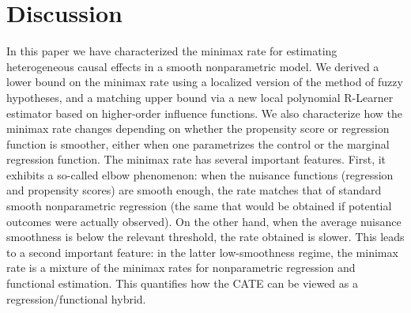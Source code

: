 \documentclass[11pt,twoside]{article}
\theoremstyle{definition}
\theoremstyle{remark}
\begin{document}
\section{Discussion}

In this paper we have characterized the minimax rate for estimating heterogeneous causal effects in a smooth nonparametric model. We derived a lower bound on the minimax rate using a localized version of the method of fuzzy hypotheses, and a matching upper bound via a new  local polynomial R-Learner estimator based on higher-order influence functions. We also characterize how the minimax rate changes depending on whether the propensity score or regression function is smoother, either when one parametrizes the control or the marginal regression function.  The minimax rate has several important features. First, it exhibits a so-called elbow phenomenon: when the nuisance functions (regression and propensity scores) are smooth enough, the rate matches that of standard smooth nonparametric regression (the same that would be obtained if potential outcomes were actually observed). On the other hand, when the average nuisance smoothness is below the relevant threshold, the rate obtained is slower. This leads to a second important feature: in the latter low-smoothness regime, the minimax rate is a mixture of the minimax rates for nonparametric regression and functional estimation. This quantifies how the CATE can be viewed as a regression/functional hybrid. \\
\end{document}
